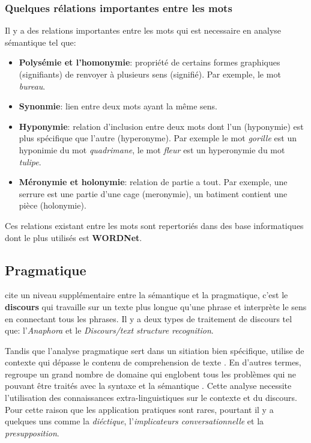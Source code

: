 \subsubsection*{Quelques rélations importantes entre les mots}
Il y a des relations importantes entre les mots \citep{automatic-nlp} qui est necessaire en analyse sémantique tel que:
\begin{itemize}
    \item \textbf{Polysémie et l'homonymie}: propriété de certains formes graphiques (signifiants) de renvoyer à plusieurs sens (signifié). Par exemple, le mot \textit{bureau}.
    \item \textbf{Synonmie}: lien entre deux mots ayant la même sens.
    \item \textbf{Hyponymie}: relation d'inclusion entre deux mots dont l'un (hyponymie) est plus spécifique que l'autre (hyperonyme). Par exemple le mot \textit{gorille} est un hyponimie du mot \textit{quadrimane}, le mot \textit{fleur} est un hyperonymie du mot \textit{tulipe}.
    \item \textbf{Méronymie et holonymie}: relation de partie a tout. Par exemple, une serrure est une partie d'une cage (meronymie), un batiment contient une pièce (holonymie).
\end{itemize}

Ces relations existant entre les mots sont repertoriés dans des base informatiques dont le plus utilisés est \textbf{WORDNet}.

\subsection{Pragmatique}
\citeauthor{natural-language-processing} cite un niveau supplémentaire entre la sémantique et la pragmatique, c'est le \textbf{discours} qui travaille sur un texte plus longue qu'une phrase et interprète le sens en connectant tous les phrases. Il y a deux types de traitement de discours tel que: l'\textit{Anaphora} et le \textit{Discours/text structure recognition}.

Tandis que l'analyse pragmatique sert dans un sitiation bien spécifique, utilise de contexte qui dépasse le contenu de comprehension de texte \citep{natural-language-processing}. En d'autres termes, regroupe un grand nombre de domaine qui englobent tous les problèmes qui ne pouvant être traités avec la syntaxe et la sémantique \citep{automatic-nlp}. Cette analyse necessite l'utilisation des connaissances extra-linguistiques sur le contexte et du discours. Pour cette raison que les application pratiques sont rares, pourtant il y a quelques uns \citep{automatic-nlp} comme la \textit{diéctique}, l'\textit{implicateurs conversationnelle} et la \textit{presupposition}.

